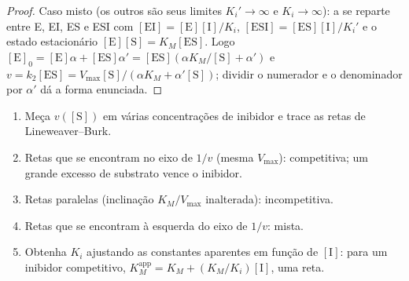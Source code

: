 \begin{proof}
Caso misto (os outros são seus limites $K_i' \to \infty$ e $K_i \to \infty$): a  se
reparte entre E, EI, ES e ESI com $[\mathrm{EI}] = [\mathrm E][\mathrm I]/K_i$, $[\mathrm{ESI}] = [\mathrm{ES}][\mathrm I]/K_i'$
e o estado estacionário $[\mathrm E][\mathrm S] = K_M[\mathrm{ES}]$. Logo $[\mathrm E]_0 = [\mathrm E]\alpha + [\mathrm{ES}]\alpha' =
[\mathrm{ES}](\alpha K_M/[\mathrm S] + \alpha')$ e $v = k_2[\mathrm{ES}] = V_{\max}[\mathrm S]/(\alpha K_M + \alpha'[\mathrm S])$; dividir o
numerador e o denominador por $\alpha'$ dá a forma enunciada.
\end{proof}

\begin{method}\label{met:b3:complex-kinetics:inhibition-type}
\begin{enumerate}
  \item Meça $v([\mathrm S])$ em várias concentrações de inibidor e trace as retas de
        Lineweaver--Burk.
  \item Retas que se encontram no eixo de $1/v$ (mesma $V_{\max}$): competitiva; um grande
        excesso de substrato vence o inibidor.
  \item Retas paralelas (inclinação $K_M/V_{\max}$ inalterada): incompetitiva.
  \item Retas que se encontram à esquerda do eixo de $1/v$: mista.
  \item Obtenha $K_i$ ajustando as constantes aparentes em função de $[\mathrm I]$: para um
        inibidor competitivo, $K_M^{\mathrm{app}} = K_M + (K_M/K_i)[\mathrm I]$, uma reta.
\end{enumerate}
\end{method}

